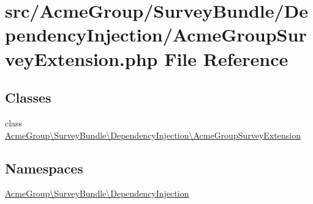 \hypertarget{_acme_group_survey_extension_8php}{\section{src/\+Acme\+Group/\+Survey\+Bundle/\+Dependency\+Injection/\+Acme\+Group\+Survey\+Extension.php File Reference}
\label{_acme_group_survey_extension_8php}
}
\subsection*{Classes}
\begin{DoxyCompactItemize}
\item 
class \hyperlink{class_acme_group_1_1_survey_bundle_1_1_dependency_injection_1_1_acme_group_survey_extension}{Acme\+Group\textbackslash{}\+Survey\+Bundle\textbackslash{}\+Dependency\+Injection\textbackslash{}\+Acme\+Group\+Survey\+Extension}
\end{DoxyCompactItemize}
\subsection*{Namespaces}
\begin{DoxyCompactItemize}
\item 
 \hyperlink{namespace_acme_group_1_1_survey_bundle_1_1_dependency_injection}{Acme\+Group\textbackslash{}\+Survey\+Bundle\textbackslash{}\+Dependency\+Injection}
\end{DoxyCompactItemize}

